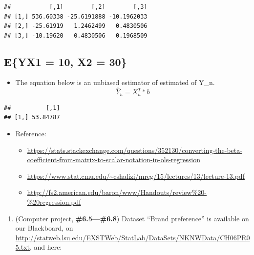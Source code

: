 \documentclass[
]{article}
\newenvironment{Shaded}{\begin{snugshade}}{\end{snugshade}}
\newcommand{\DecValTok}[1]{\textcolor[rgb]{0.00,0.00,0.81}{#1}}
\newcommand{\KeywordTok}[1]{\textcolor[rgb]{0.13,0.29,0.53}{\textbf{#1}}}
\newcommand{\NormalTok}[1]{#1}
\newcommand{\OperatorTok}[1]{\textcolor[rgb]{0.81,0.36,0.00}{\textbf{#1}}}
\newcommand{\StringTok}[1]{\textcolor[rgb]{0.31,0.60,0.02}{#1}}
\providecommand{\tightlist}{%
  \setlength{\itemsep}{0pt}\setlength{\parskip}{0pt}}
\begin{document}
\begin{verbatim}
##           [,1]        [,2]        [,3]
## [1,] 536.60338 -25.6191888 -10.1962033
## [2,] -25.61919   1.2462499   0.4830506
## [3,] -10.19620   0.4830506   0.1968509
\end{verbatim}

\hypertarget{eyx1-10-x2-30}{%
\subsection{E\{Y\textbar X1 = 10, X2 = 30\}}\label{eyx1-10-x2-30}}

\begin{itemize}
\tightlist
\item
  The equation below is an unbiased estimator of estimated of Y\_n. \[
  \hat{Y}_h = X_h^T * b
  \]
\end{itemize}

\begin{Shaded}
\end{Shaded}

\begin{verbatim}
##          [,1]
## [1,] 53.84787
\end{verbatim}

\begin{itemize}
\tightlist
\item
  Reference:

  \begin{itemize}
  \tightlist
  \item
    \url{https://stats.stackexchange.com/questions/352130/converting-the-beta-coefficient-from-matrix-to-scalar-notation-in-ols-regression}
  \item
    \url{https://www.stat.cmu.edu/~cshalizi/mreg/15/lectures/13/lecture-13.pdf}
  \item
    \url{http://fs2.american.edu/baron/www/Handouts/review\%20-\%20regression.pdf}
  \end{itemize}
\end{itemize}

\begin{enumerate}
\def\labelenumi{\arabic{enumi}.}
\setcounter{enumi}{3}
\tightlist
\item
  (Computer project, \textbf{\#6.5---\#6.8}) Dataset ``Brand
  preference'' is available on our Blackboard, on
  \url{http://statweb.lsu.edu/EXSTWeb/StatLab/DataSets/NKNWData/CH06PR05.txt},
  and here:
\end{enumerate}
\end{document}
